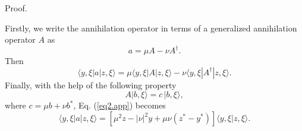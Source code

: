 \documentclass[aps,pra,preprint,superscriptaddress, showpacs]{revtex4-2}
\begin{document}
\begin{enumerate}
	Proof.
	
	Firstly, we write the annihilation operator in terms of a generalized annihilation operator $A$ \cite{orszag2016quantum} as
	\begin{equation}
	a=\mu A-\nu A^{\dagger}.
	\end{equation}
	Then 
	\begin{equation}\label{eq2.app}
	\langle y, \xi|a|z, \xi\rangle=\mu \langle y, \xi|A|z, \xi\rangle-\nu \langle y, \xi|A^{\dagger}|z, \xi\rangle.
	\end{equation}
	Finally, with the help of the following property \cite{orszag2016quantum}
	\begin{equation}
	A|b,\xi\rangle=c\,|b,\xi\rangle,
	\end{equation}
	where $c=\mu b+\nu b^{*}$, Eq. (\ref{eq2.app}) becomes
	\begin{equation}
	\langle y, \xi|a|z, \xi\rangle=\left[\mu^{2} z-|\nu|^2 y+\mu\nu(z^{*}-y^{*})\right]\langle y, \xi|z, \xi \rangle.
	\end{equation}
\end{enumerate}




\end{document}
